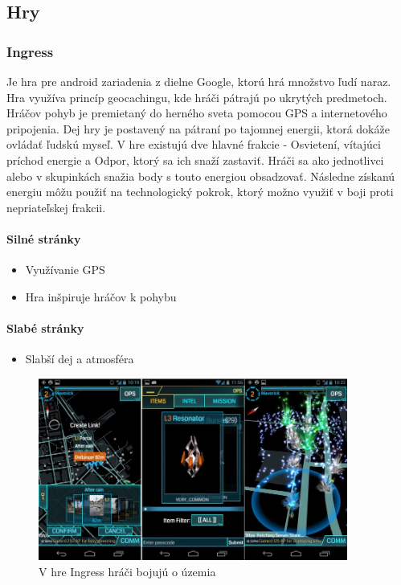 \subsection{Hry}


\subsubsection{Ingress} Je hra pre android zariadenia z dielne Google, ktorú hrá množstvo ľudí naraz. Hra využíva princíp geocachingu, kde hráči pátrajú po ukrytých predmetoch. Hráčov pohyb je premietaný do herného sveta pomocou GPS a internetového pripojenia. Dej hry je postavený na pátraní po tajomnej energii, ktorá dokáže ovládať ľudskú myseľ. V hre existujú dve hlavné frakcie - Osvietení, vítajúci príchod energie a Odpor, ktorý sa ich snaží zastaviť. Hráči sa ako jednotlivci alebo v skupinkách snažia body s touto energiou obsadzovať. Následne získanú energiu môžu použiť na technologický pokrok, ktorý možno využiť v boji proti nepriateľskej frakcii. 

\paragraph*{Silné stránky}
\begin{itemize}
  \item Využívanie GPS
  \item Hra inšpiruje hráčov k pohybu
\end{itemize}
\paragraph*{Slabé stránky}
\begin{itemize}
  \item Slabší dej a atmosféra

\end{itemize}

\begin{figure}
  \centering
  \includegraphics[height=6cm]{mainmatter/imgs/ingress.jpg}
  \caption{V hre Ingress hráči bojujú o územia}
  \label{fig:ingress}
\end{figure}



